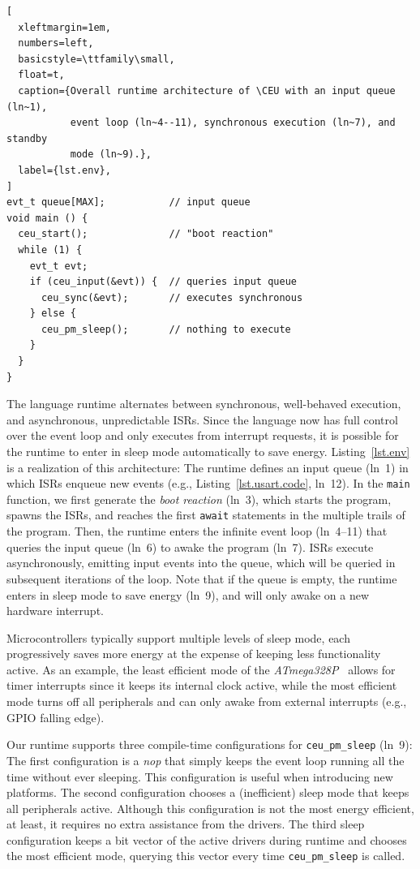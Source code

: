 \documentclass[sigplan,10pt,review,anonymous]{acmart}\settopmatter{printfolios=true,printccs=false,printacmref=false}
\newcommand{\CEU}{\textsc{C\'{e}u}\xspace}
\newcommand{\code}[1] {{\small{\texttt{#1}}}}
\begin{document}
\begin{lstlisting}[
  xleftmargin=1em,
  numbers=left,
  basicstyle=\ttfamily\small,
  float=t,
  caption={Overall runtime architecture of \CEU with an input queue (ln~1),
           event loop (ln~4--11), synchronous execution (ln~7), and standby
           mode (ln~9).},
  label={lst.env},
]
evt_t queue[MAX];           // input queue
void main () {
  ceu_start();              // "boot reaction"
  while (1) {
    evt_t evt;
    if (ceu_input(&evt)) {  // queries input queue
      ceu_sync(&evt);       // executes synchronous
    } else {
      ceu_pm_sleep();       // nothing to execute
    }
  }
}
\end{lstlisting}

The language runtime
alternates between synchronous, well-behaved execution, and asynchronous,
unpredictable ISRs.
%
Since the language now has full control over the event loop and only executes
from interrupt requests, it is possible for the runtime to enter in sleep mode
automatically to save energy.
%
Listing~\ref{lst.env} is a realization of this architecture:
%
The runtime defines an input queue (ln~1) in which ISRs enqueue new events
(e.g., Listing~\ref{lst.usart.code}, ln~12).
%
In the \code{main} function, we first generate the \emph{boot reaction} (ln~3),
which starts the program, spawns the ISRs, and reaches the first \code{await}
statements in the multiple trails of the program.
%
Then, the runtime enters the infinite event loop (ln~4--11) that queries the input
queue (ln~6) to awake the program (ln~7).
%
ISRs execute asynchronously, emitting input events into the queue, which will
be queried in subsequent iterations of the loop.
%
Note that if the queue is empty, the runtime enters in sleep mode to save
energy (ln~9), and will only awake on a new hardware interrupt.

Microcontrollers typically support multiple levels of sleep mode, each
progressively saves more energy at the expense of keeping less functionality
active.
%
As an example, the least efficient mode of the
\emph{ATmega328P}~\cite{arduino.atmega328p} allows for
timer interrupts since it keeps its internal clock active, while the most
efficient mode turns off all peripherals and can only awake from external
interrupts (e.g., GPIO falling edge).

Our runtime supports three compile-time configurations for \code{ceu\_pm\_sleep}
(ln~9):
%
The first configuration is a \emph{nop} that simply keeps the event loop
running all the time without ever sleeping.
This configuration is useful when introducing new platforms.
%
The second configuration chooses a (inefficient) sleep mode that keeps all
peripherals active.
Although this configuration is not the most energy efficient, at least, it
requires no extra assistance from the drivers.
%
The third sleep configuration keeps a bit vector of the active drivers during runtime
and chooses the most efficient mode, querying this vector every time
\code{ceu\_pm\_sleep} is called.
\end{document}
